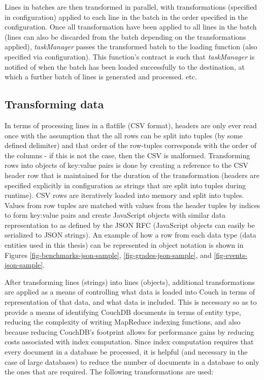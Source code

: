 Lines in batches are then transformed in parallel, with transformations (specified in configuration) applied to each line in the batch in the order specified in the configuration. Once all transformation have been applied to all lines in the batch (lines can also be discarded from the batch depending on the transformations applied), \textit{taskManager} passes the transformed batch to the loading function (also specified via configuration). This function's contract is such that \textit{taskManager} is notified of when the batch has been loaded successfully to the destination, at which a further batch of lines is generated and processed. etc.

\subsection{Transforming data}
In terms of processing lines in a flatfile (CSV format), headers are only ever read once with the assumption that the all rows can be split into tuples (by some defined delimiter) and that order of the row-tuples corresponds with the order of the columns - if this is not the case, then the CSV is malformed. Transforming rows into objects of key:value pairs is done by creating a reference to the CSV header row that is maintained for the duration of the transformation (headers are specified explicitly in configuration as strings that are split into tuples during runtime). CSV rows are iteratively loaded into memory and split into tuples. Values from row tuples are matched with values from the header tuples by indices to form key:value pairs and create JavaScript objects with similar data representation to as defined by the JSON RFC \cite{rfc7159} (JavaScript objects can easily be serialized to JSON strings). An example of how a row from each data type (data entities used in this thesis) can be represented in object notation is shown in Figures \ref{fig-benchmarks-json-sample}, \ref{fig-grades-json-sample}, and \ref{fig-events-json-sample}.





After transforming lines (strings) into lines (objects), additional transformations are applied as a means of controlling what data is loaded into Couch in terms of representation of that data, and what data is included. This is necessary so as to provide a means of identifying CouchDB documents in terms of entity type, reducing the complexity of writing MapReduce indexing functions, and also because reducing CouchDB's footprint allows for performance gains by reducing costs associated with index computation. Since index computation requires that every document in a database be processed, it is helpful (and necessary in the case of large databases) to reduce the number of documents in a database to only the ones that are required. The following transformations are used:

